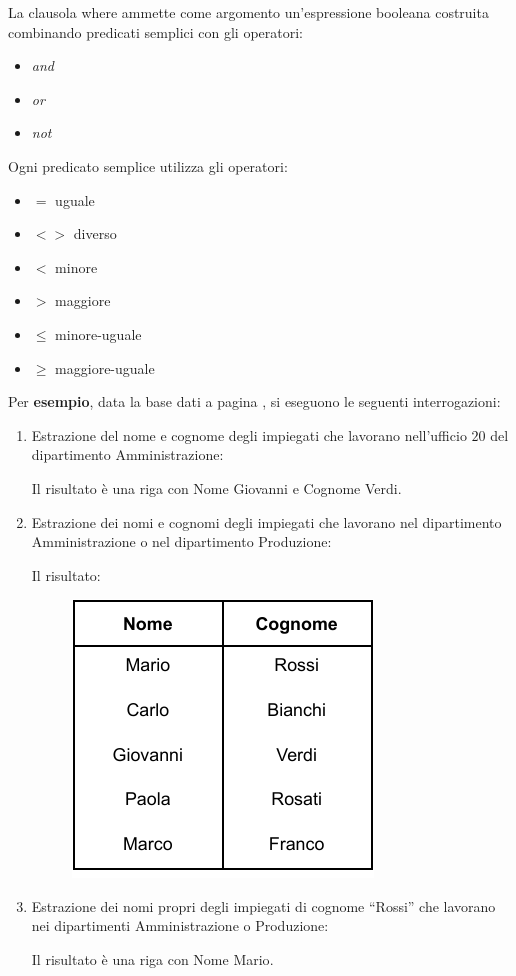\documentclass[a4paper]{article}
\newcommand{\dquotes}[1]{``#1''}
\begin{document}
	La clausola \textsf{where} ammette come argomento un'espressione booleana costruita combinando predicati semplici con gli operatori:
	\begin{itemize}
		\item \emph{and}
		\item \emph{or}
		\item \emph{not}
	\end{itemize}
	Ogni predicato semplice utilizza gli operatori:
	\begin{itemize}
		\item $=$ uguale
		\item $<>$ diverso
		\item $<$ minore
		\item $>$ maggiore
		\item $\le$ minore-uguale
		\item $\ge$ maggiore-uguale
	\end{itemize}
	Per \textcolor{Green4}{\textbf{esempio}}, data la base dati a pagina \pageref{img: select dbms}, si eseguono le seguenti interrogazioni:
	\begin{enumerate}
		\item Estrazione del nome e cognome degli impiegati che lavorano nell'ufficio $20$ del dipartimento Amministrazione:
		
		Il risultato è una riga con \textsf{Nome} \textsf{Giovanni} e \textsf{Cognome} \textsf{Verdi}.
		
		\item Estrazione dei nomi e cognomi degli impiegati che lavorano nel dipartimento Amministrazione o nel dipartimento Produzione:
		
		Il risultato:
		\begin{figure}[!htp]
			\centering
			\includegraphics[width=.35\textwidth]{img/where-ex2.pdf}
		\end{figure}\newpage
		
		\item Estrazione dei nomi propri degli impiegati di cognome \dquotes{Rossi} che lavorano nei dipartimenti Amministrazione o Produzione:
		
		Il risultato è una riga con \textsf{Nome} \textsf{Mario}.
	\end{enumerate}
\end{document}

